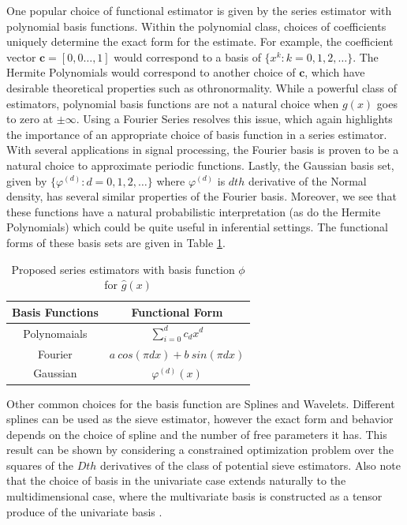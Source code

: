 \documentclass[12pt]{article}  %
\begin{document}
One popular choice of functional estimator is given by the series estimator with polynomial basis functions. Within the polynomial class, choices of coefficients uniquely determine the exact form for the estimate. For example, the coefficient vector $\textbf{c} = [0,0 \ldots, 1]$ would correspond to a basis of $\{x^{k}: k = 0,1,2,\ldots\}$. The Hermite Polynomials would correspond to another choice of $\textbf{c}$, which have desirable theoretical properties such as othronormality. While a powerful class of estimators, polynomial basis functions are not a natural choice when $g(x)$ goes to zero at $\pm \infty$. Using a Fourier Series resolves this issue, which again highlights the importance of an appropriate choice of basis function in a series estimator. With several applications in signal processing, the Fourier basis is proven to be a natural choice to approximate periodic functions. Lastly, the Gaussian basis set, given by $\{\varphi^{(d)}:d= 0,1,2,\dots\}$ where $\varphi^{(d)}$ is $dth$ derivative of the Normal density, has several similar properties of the Fourier basis. Moreover, we see that these functions have a natural probabilistic interpretation (as do the Hermite Polynomials) which could be quite useful in inferential settings. The functional forms of these basis sets are given in Table \ref{tab:basis}. 

\begin{table}[h]
\begin{center}
\begin{tabular}{|c|c|}
\hline
Basis Functions & Functional Form\\
\hline
Polynomaials & $\sum_{i=0}^{d} c_d x^d$\\
Fourier &$a~cos(\pi d x) + b~sin(\pi d x)$\\
Gaussian &$\varphi^{(d)}(x)$\\
\hline
\end{tabular}
\caption {Proposed series estimators with basis function $\phi$ for $\hat{g}(x)$ }
\label{tab:basis}
\end{center}
\end{table}
Other common choices for the basis function are Splines and Wavelets.  Different splines can be used as the sieve estimator, however the exact form and behavior depends on the choice of spline and the number of free parameters it has.  This result can be shown by considering a constrained optimization problem over the squares of the $Dth$ derivatives of the class of potential sieve estimators. Also note that the choice of basis in the univariate case extends naturally to the multidimensional case, where the multivariate basis is constructed as a tensor produce of the univariate basis \cite{Chen}.
\end{document}
